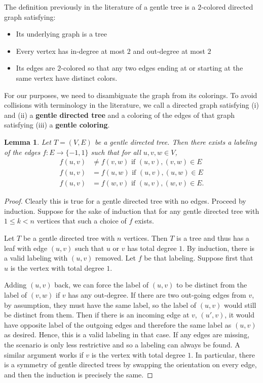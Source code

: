 \documentclass[12pt]{amsart}
\newtheorem{lem}[thm]{Lemma}
\theoremstyle{definition}
\theoremstyle{remark}
\numberwithin{equation}{section}
\begin{document}
The definition previously in the literature of a gentle tree is a $2$-colored directed graph satisfying: 
\begin{itemize}
    \item[(i)] Its underlying graph is a tree
    \item[(ii)] Every vertex has in-degree at most $2$ and out-degree at most $2$
    \item[(iii)] Its edges are $2$-colored so that any two edges ending at or starting at the same vertex have distinct colors.
\end{itemize}
For our purposes, we need to disambiguate the graph from its colorings. To avoid collisions with terminology in the literature, we call a directed graph satisfying (i) and (ii) a \textbf{gentle directed tree} and a coloring of the edges of that graph satisfying (iii) a \textbf{gentle coloring}. 


\begin{lem}
\label{lem:epochs}
Let $T = (V,E)$ be a gentle directed tree. Then there exists a labeling of the edges $f: E \to \{-1,1\}$ such that for all $u,v,w \in V$,
\begin{align*}
    f(u,v) &\neq f(v,w) \text{ if } (u,v), (v,w) \in E \\
    f(u,v) &= f(u,w) \text{ if } (u,v), (u,w) \in E \\
    f(u,v) &= f(w,v) \text{ if } (u,v), (w,v) \in E.
\end{align*} 
\end{lem}

\begin{proof}
Clearly this is true for a gentle directed tree with no edges. Proceed by induction. Suppose for the sake of induction that for any gentle directed tree with $1 \leq k < n$ vertices that such a choice of $f$ exists. 

Let $T$ be a gentle directed tree with $n$ vertices. Then $T$ is a tree and thus has a leaf with edge $(u,v)$ such that $u$ or $v$ has total degree $1$. By induction, there is a valid labeling with $(u,v)$ removed. Let $f$ be that labeling. Suppose first that $u$ is the vertex with total degree $1$. 

Adding $(u,v)$ back, we can force the label of $(u,v)$ to be distinct from the label of $(v,w)$ if $v$ has any out-degree. If there are two out-going edges from $v$, by assumption, they must have the same label, so the label of $(u,v)$ would still be distinct from them. Then if there is an incoming edge at $v$, $(u',v)$, it would have opposite label of the outgoing edges and therefore the same label as $(u,v)$ as desired. Hence, this is a valid labeling in that case. If any edges are missing, the scenario is only less restrictive and so a labeling can always be found. A similar argument works if $v$ is the vertex with total degree $1$. In particular, there is a symmetry of gentle directed trees by swapping the orientation on every edge, and then the induction is precisely the same.
\end{proof}
\end{document}
